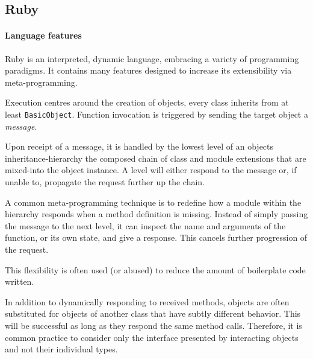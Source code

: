 \subsection{Ruby}
\paragraph*{Language features}
Ruby\cite{rubylang} is an interpreted, dynamic language, embracing a variety of programming paradigms. It contains many features designed to increase its extensibility via meta-programming.

Execution centres around the creation of objects, every class inherits from at least \verb|BasicObject|. Function invocation is triggered by sending the target object a \emph{message}.

Upon receipt of a message, it is handled by the lowest level of an objects inheritance-hierarchy \textemdash{} the composed chain of class and module extensions that are mixed-into the object instance. A level will either respond to the message or, if unable to, propagate the request further up the chain.

A common meta-programming technique is to redefine how a module within the hierarchy responds when a method definition is missing. Instead of simply passing the message to the next level, it can inspect the name and arguments of the function, or its own state, and give a response. This cancels further progression of the request.

\begin{comment}
\begin{lstlisting}[
  language=Ruby,
  label=lst:methmiss,
  caption=A toy example where an object responds to a missing method instead of propagating the message.
]
class HungryHippo
  def eat
    puts "Nom nom nom!"
  end

  def method_missing(meth, *args, &block)
    if /eat/.match meth.to_s
      puts "Eat? ok then."
      eat
    else
      super
    end
  end
end

hippo = HungryHippo.new
hippo.eat
hippo.dont_eat
# >> Nom nom nom!
# >> Eat? ok then.
# >> Nom nom nom!
\end{lstlisting}
\end{comment}

This flexibility is often used (or abused) to reduce the amount of boilerplate code written.

In addition to dynamically responding to received methods, objects are often substituted for objects of another class that have subtly different behavior. This will be successful as long as they respond the same method calls. Therefore, it is common practice to consider only the interface presented by interacting objects and not their individual types.


